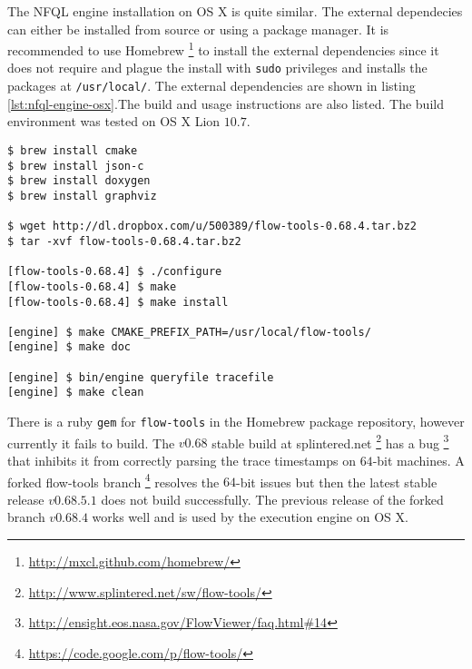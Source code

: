 The \ac{NFQL} engine installation on OS X is quite similar. The external
dependecies can either be installed from source or using a package manager.
It is recommended to use Homebrew
\footnote{\url{http://mxcl.github.com/homebrew/}} to install the external
dependencies  since it does not require and
plague the install with \texttt{sudo} privileges and installs the packages at
\texttt{/usr/local/}. The external dependencies are shown in listing
\ref{lst:nfql-engine-osx}.The build and usage instructions are also listed.
The build environment was tested on OS X Lion $10.7$.

\begin{lstlisting}
$ brew install cmake
$ brew install json-c
$ brew install doxygen
$ brew install graphviz

$ wget http://dl.dropbox.com/u/500389/flow-tools-0.68.4.tar.bz2
$ tar -xvf flow-tools-0.68.4.tar.bz2

[flow-tools-0.68.4] $ ./configure
[flow-tools-0.68.4] $ make
[flow-tools-0.68.4] $ make install

[engine] $ make CMAKE_PREFIX_PATH=/usr/local/flow-tools/
[engine] $ make doc

[engine] $ bin/engine queryfile tracefile
[engine] $ make clean
\end{lstlisting}

There is a ruby \texttt{gem} for \texttt{flow-tools} in the Homebrew package
repository, however currently it fails to build. The $v0.68$ stable build at
splintered.net \footnote{\url{http://www.splintered.net/sw/flow-tools/}} has a
bug \footnote{\url{http://ensight.eos.nasa.gov/FlowViewer/faq.html#14}} that
inhibits it from correctly parsing the trace timestamps  on $64$-bit machines. A forked flow-tools branch
\footnote{\url{https://code.google.com/p/flow-tools/}} resolves the $64$-bit
issues but then the latest stable release $v0.68.5.1$ does not build
successfully. The previous release of the forked branch $v0.68.4$ works well
and is used by the execution engine on OS X.
